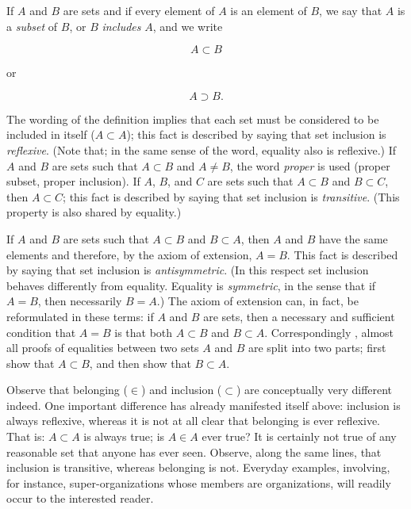 If $A$ and $B$ are sets and if every element of $A$ is an element of $B$, we say that $A$ is a \textit{subset} of $B$, or $B$ \textit{includes} $A$, and we write 

\begin{equation*}
A \subset B
\end{equation*}

or

\begin{equation*}
A \supset B.
\end{equation*}

The wording of the definition implies that each set must be considered to be included in itself ($A \subset A$); this fact is described by saying that set inclusion is \textit{reflexive}. (Note that; in the same sense of the word, equality also is reflexive.) If $A$ and $B$ are sets such that $A \subset B$ and $A \neq B$, the word \textit{proper} is used (proper subset, proper inclusion). If $A$, $B$, and $C$ are sets such that $A \subset B$ and $B \subset C$, then $A \subset C$; this fact is described by saying that set inclusion is \textit{transitive}. (This property is also shared by equality.)

If $A$ and $B$ are sets such that $A \subset B$ and $B \subset A$, then $A$ and $B$ have the same elements and therefore, by the axiom of extension, $A = B$. This fact is described by saying that set inclusion is \textit{antisymmetric}. (In this respect set inclusion behaves differently from equality. Equality is \textit{symmetric}, in the sense that if $A = B$, then necessarily $B = A$.) The axiom of extension can, in fact, be reformulated in these terms: if $A$ and $B$ are sets, then a necessary and sufficient condition that $A = B$ is that both $A \subset B$ and $B \subset A$. Correspondingly , almost all proofs of equalities between two sets $A$ and $B$ are split into two parts; first show that $A \subset B$, and then show that $B \subset A$. 

Observe that belonging ($\in$) and inclusion ($\subset$) are conceptually very different indeed. One important difference has already manifested itself above: inclusion is always reflexive, whereas it is not at all clear that belonging is ever reflexive. That is: $A \subset A$ is always true; is $A \in A $ ever true? It is certainly not true of any reasonable set that anyone has ever seen. Observe, along the same lines, that inclusion is transitive, whereas belonging is not. Everyday examples, involving, for instance, super-organizations whose members are organizations, will readily occur to the interested reader.